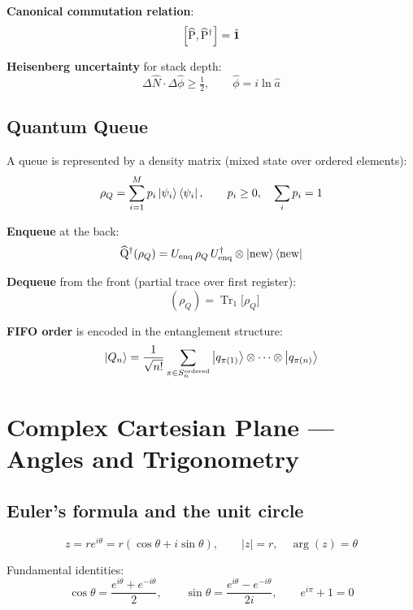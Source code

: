 \documentclass[12pt,a4paper]{article}
\DeclareMathOperator{\Push}{\widehat{P}^\dagger}
\DeclareMathOperator{\Pop}{\widehat{P}}
\DeclareMathOperator{\Enq}{\widehat{Q}^\dagger}
\DeclareMathOperator{\Deq}{\widehat{Q}}
\begin{document}
\textbf{Canonical commutation relation}:
\[
  \comm{\Pop}{\Push} = \hat{\mathbf{1}}
\]

\textbf{Heisenberg uncertainty} for stack depth:
\[
  \Delta \hat{N} \cdot \Delta \hat{\phi} \geq \tfrac{1}{2},
  \qquad \hat{\phi} = i\ln\hat{a}
\]

\subsection{Quantum Queue}

A queue is represented by a density matrix (mixed state over ordered elements):
\[
  \rho_Q = \sum_{i=1}^{M} p_i \ket{\psi_i}\bra{\psi_i},
  \qquad p_i \geq 0,\quad \sum_i p_i = 1
\]

\textbf{Enqueue} at the back:
\[
  \Enq(\rho_Q) = U_{\text{enq}}\,\rho_Q\,U_{\text{enq}}^\dagger
  \otimes \ket{\text{new}}\bra{\text{new}}
\]

\textbf{Dequeue} from the front (partial trace over first register):
\[
  \Deq(\rho_Q) = \operatorname{Tr}_1\!\bigl[\rho_Q\bigr]
\]

\textbf{FIFO order} is encoded in the entanglement structure:
\[
  \ket{Q_n} = \frac{1}{\sqrt{n!}}\sum_{\pi \in S_n^{\text{ordered}}} \ket{q_{\pi(1)}} \otimes \cdots \otimes \ket{q_{\pi(n)}}
\]

\section{Complex Cartesian Plane — Angles and Trigonometry}

\subsection{Euler's formula and the unit circle}

\[
  z = r e^{i\theta} = r(\cos\theta + i\sin\theta),
  \qquad |z| = r,\quad \arg(z) = \theta
\]

Fundamental identities:
\[
  \cos\theta = \frac{e^{i\theta} + e^{-i\theta}}{2}, \qquad
  \sin\theta = \frac{e^{i\theta} - e^{-i\theta}}{2i}, \qquad
  e^{i\pi} + 1 = 0
\]
\end{document}

